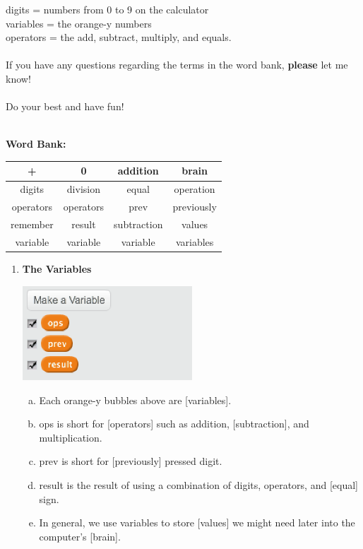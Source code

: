 \documentclass[11pt]{article}
\begin{document}
digits = numbers from 0 to 9 on the calculator\\
variables = the orange-y numbers\\
operators = the add, subtract, multiply, and equals.\\\\
If you have any questions regarding the terms in the word bank, \textbf{please} let me know!\\\\
Do your best and have fun!\\
\noindent\makebox[\linewidth]{\rule{\paperwidth}{0.4pt}}\\
\begin{center}
\textbf{Word Bank:}
\begin{tabular}{|c|c|c|c|}
    \hline
    + & 0 & addition & brain \\
    \hline
    digits & division & equal & operation \\
    \hline
    operators & operators & prev & previously \\
    \hline
    remember & result & subtraction & values \\
    \hline
    variable & variable & variable & variables \\
    \hline
\end{tabular}
\end{center}
\noindent\makebox[\linewidth]{\rule{\paperwidth}{0.4pt}}
\begin{enumerate}
\item \textbf{The Variables}
\begin{center}
  \includegraphics[width=2.5in]{vars.png}
 \end{center}
\begin{enumerate}[a.]
\item Each orange-y bubbles above are [variables].
\item ops is short for [operators] such as addition, [subtraction], and multiplication.
\item prev is short for [previously] pressed digit.
\item result is the result of using a combination of digits, operators, and [equal] sign.
\item In general, we use variables to store [values] we might need later into the computer's [brain].
\end{enumerate}
\end{enumerate}
\end{document}
